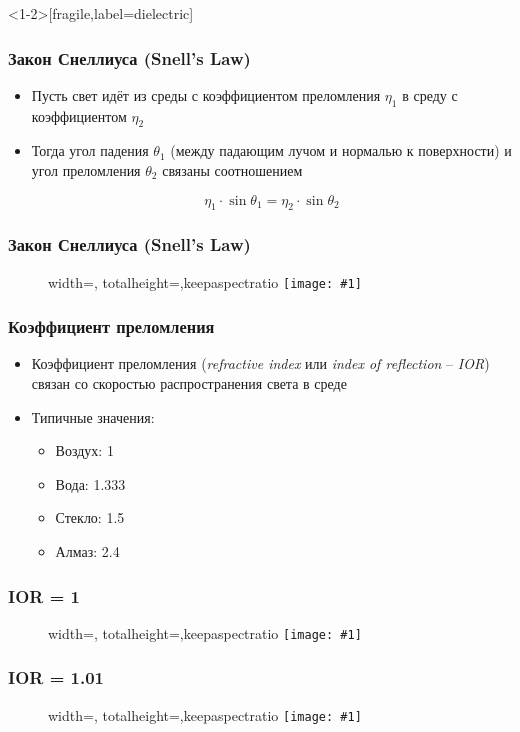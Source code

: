 \documentclass[10pt]{beamer}
\newcommand{\slideimage}[1]{
  \begin{figure}
    \begin{adjustbox}{width=\textwidth, totalheight=\textheight-2\baselineskip-2\baselineskip,keepaspectratio}
      \texttt{[image: \#1]}
    \end{adjustbox}
  \end{figure}
}
\begin{document}
\begin{frame}<1-2>[fragile,label=dielectric]
\frametitle{Закон Снеллиуса (Snell's Law)}
\begin{itemize}
\item Пусть свет идёт из среды с коэффициентом преломления \begin{math}\eta_1\end{math} в среду с коэффициентом \begin{math}\eta_2\end{math}
\pause
\item Тогда угол падения \begin{math}\theta_1\end{math} (между падающим лучом и нормалью к поверхности) и угол преломления \begin{math}\theta_2\end{math} связаны соотношением

\begin{equation*}
\eta_1 \cdot \sin \theta_1 = \eta_2 \cdot \sin \theta_2
\end{equation*}
\end{itemize}
\end{frame}

\begin{frame}[fragile]
\frametitle{Закон Снеллиуса (Snell's Law)}
\slideimage{snells_law.png}
\end{frame}

\begin{frame}
\frametitle{Коэффициент преломления}
\begin{itemize}
\item Коэффициент преломления (\textit{refractive index} или \textit{index of reflection} -- \textit{IOR}) связан со скоростью распространения света в среде
\pause
\item Типичные значения:
\begin{itemize}
\item Воздух: 1
\item Вода: 1.333
\item Стекло: 1.5
\item Алмаз: 2.4
\end{itemize}
\end{itemize}
\end{frame}

\begin{frame}[fragile]
\frametitle{IOR = 1}
\slideimage{ior_100.png}
\end{frame}

\begin{frame}[fragile]
\frametitle{IOR = 1.01}
\slideimage{ior_101.png}
\end{frame}
\end{document}
